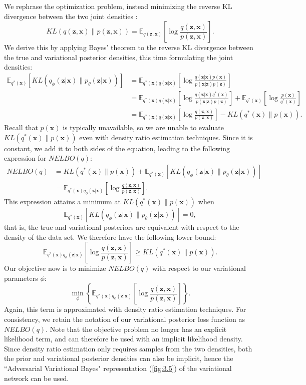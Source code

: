 \documentclass[honours,12pt, twoside]{unswthesis}
\newcommand{\E}{\mathbb{E}}
\numberwithin{equation}{section}
\theoremstyle{definition}
\begin{document}
We rephrase the optimization problem, instead minimizing the reverse KL divergence between the two joint densities \citep{tran}: \[KL(q(\bm{z},\bm{x})\|p(\bm{z},\bm{x}))=\E_{q(\bm{z},\bm{x})}\left[\log\frac{q(\bm{z},\bm{x})}{p(\bm{z},\bm{x})}\right].\] We derive this by applying Bayes' theorem to the reverse KL divergence between the true and variational posterior densities, this time formulating the joint densities:
\begin{align*}
\mathbb{E}_{q^*(\bm{x})}\left[KL(q_\phi(\bm{z}|\bm{x})\|p_\theta (\bm{z}|\bm{x}))\right]&=\mathbb{E}_{q^*(\bm{x})q(\bm{z}|\bm{x})}\left[\log \frac{q(\bm{z}|\bm{x})p(\bm{x})}{p(\bm{x}|\bm{z})p(\bm{z})}\right]\\
&=\mathbb{E}_{q^*(\bm{x})q(\bm{z}|\bm{x})}\left[\log \frac{q(\bm{z}|\bm{x})q^*(\bm{x})}{p(\bm{x}|\bm{z})p(\bm{z})}\right]+\mathbb{E}_{q^*(\bm{x})}\left[\log \frac{p(\bm{x})}{q^*(\bm{x})}\right]\\
&= \mathbb{E}_{q^*(\bm{x})q(\bm{z}|\bm{x})}\left[\log \frac{q(\bm{z},\bm{x})}{p(\bm{z},\bm{x})}\right]-KL(q^*(\bm{x})\|p(\bm{x})).
\end{align*}
Recall that $p(\bm{x})$ is typically unavailable, so we are unable to evaluate $KL(q^*(\bm{x})\|p(\bm{x}))$ even with density ratio estimation techniques. Since it is constant, we add it to both sides of the equation, leading to the following expression for $NELBO(q)$:
\begin{align*}
NELBO(q) &= KL(q^*(\bm{x})\|p(\bm{x}))+\mathbb{E}_{q^*(\bm{x})}\left[KL(q_\phi(\bm{z}|\bm{x})\|p_\theta(\bm{z}|\bm{x}))\right]\\
&=\mathbb{E}_{q^*(\bm{x})q_\phi(\bm{z}|\bm{x})}\left[\log \frac{q(\bm{z},\bm{x})}{p(\bm{z},\bm{x})}\right].
\end{align*}
This expression attains a minimum at $KL(q^*(\bm{x})\|p(\bm{x}))$ when \[\mathbb{E}_{q^*(\bm{x})}\left[KL(q_\phi(\bm{z}|\bm{x})\|p_\theta(\bm{z}|\bm{x}))\right]=0,\] that is, the true and variational posteriors are equivalent with respect to the density of the data set. We therefore have the following lower bound:
\[\mathbb{E}_{q^*(\bm{x})q_\phi(\bm{z}|\bm{x})}\left[\log \frac{q(\bm{z},\bm{x})}{p(\bm{z},\bm{x})}\right]\geq KL(q^*(\bm{x})\|p(\bm{x})).\]
Our objective now is to minimize $NELBO(q)$ with respect to our variational parameters $\phi$:
\begin{equation}
\min_\phi \left\lbrace\mathbb{E}_{q^*(\bm{x})q_\phi(\bm{z}|\bm{x})}\left[\log \frac{q(\bm{z},\bm{x})}{p(\bm{z},\bm{x})}\right]\right\rbrace.
\end{equation}
Again, this term is approximated with density ratio estimation techniques. For consistency, we retain the notation of our variational posterior loss function as $NELBO(q)$. Note that the objective problem no longer has an explicit likelihood term, and can therefore be used with an implicit likelihood density. Since density ratio estimation only requires samples from the two densities, both the prior and variational posterior densities can also be implicit, hence the ``Adversarial Variational Bayes" representation (\autoref{fig:3.5}) of the variational network can be used.
\end{document}
